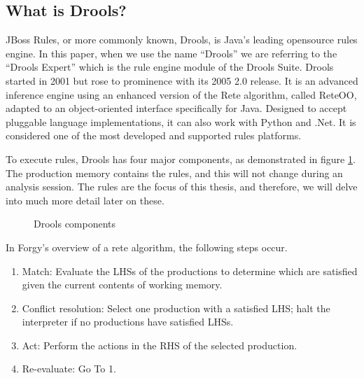 \subsection{What is Drools?}\label{section:WhatIsDrools}

JBoss Rules, or more commonly known, Drools, is Java's leading opensource rules engine.
In this paper, when we use the name ``Drools'' we are referring to the ``Drools Expert'' which is the rule engine module of the Drools Suite.
Drools started in 2001 but rose to prominence with its 2005 2.0 release.
It is an advanced inference engine using an enhanced version of the Rete algorithm, called Rete\-OO\cite{sottara2010configurable}, adapted to an object-oriented interface specifically for Java.
Designed to accept pluggable language implementations, it can also work with Python and .Net.
It is considered one of the most developed and supported rules platforms.

To execute rules, Drools has four major components, as demonstrated in figure \ref{fig:Drools_components}.
The production memory contains the rules, and this will not change during an analysis session.
The rules are the focus of this thesis, and therefore, we will delve into much more detail later on these.

\begin{figure}[h]
    \centering
    \caption{Drools components}
    \label{fig:Drools_components}
\end{figure}

In Forgy's\cite{forgy1989rete} overview of a rete algorithm, the following steps occur.
\begin{enumerate}
    \setlength\itemsep{0em}
    \item Match: Evaluate the LHSs of the productions to determine which are satisfied given the current contents of working memory.
    \item Conflict resolution: Select one production with a satisfied LHS; halt the interpreter if no productions have satisfied LHSs.
    \item Act: Perform the actions in the RHS of the selected production.
    \item Re-evaluate: Go To 1.
\end{enumerate}

